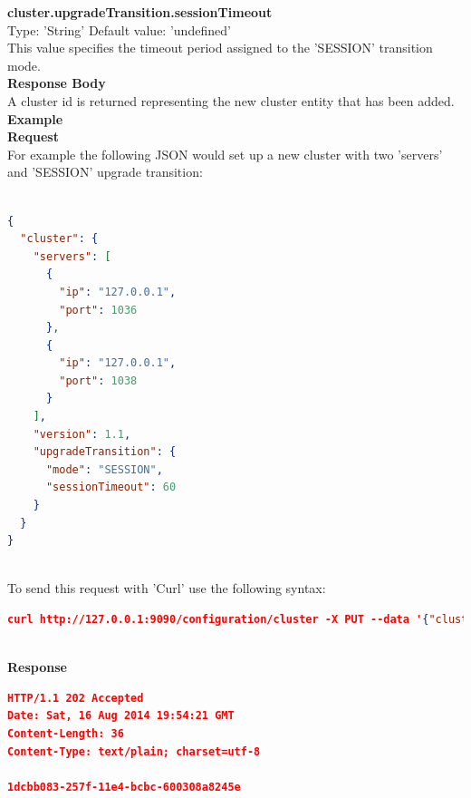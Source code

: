 \documentclass[a4paper,11pt,twoside]{article}
\begin{document}
\noindent
\textbf{cluster.upgradeTransition.sessionTimeout}\\
\noindent
Type: 'String' Default value: 'undefined'\\
\noindent
This value specifies the timeout period assigned to the 'SESSION' transition mode. \\

\noindent
\textbf{Response Body}\\
\noindent
A cluster id is returned representing the new cluster entity that has been added. \\

\noindent
\textbf{Example}\\

\noindent
\textbf{Request}\\
\noindent
For example the following JSON would set up a new cluster with two 'servers' and 'SESSION' upgrade transition:

\begin{lstlisting}[language=json,firstnumber=1]

{
  "cluster": {
    "servers": [
      {
        "ip": "127.0.0.1", 
        "port": 1036
      },  
      {
        "ip": "127.0.0.1", 
        "port": 1038
      }
    ], 
    "version": 1.1, 
    "upgradeTransition": {
      "mode": "SESSION", 
      "sessionTimeout": 60
    }
  }
}
\end{lstlisting}

\noindent \\
To send this request with 'Curl' use the following syntax:\\

\begin{lstlisting}[language=json,firstnumber=1]
curl http://127.0.0.1:9090/configuration/cluster -X PUT --data '{"cluster": {"servers":[{"ip": "127.0.0.1", "port": 1036},{"ip": "127.0.0.1", "port": 1038}],"version": 1.1,"upgradeTransition": { "mode": "SESSION", "sessionTimeout": 60 }}}'
\end{lstlisting}

\noindent \\
\textbf{Response}\\

\begin{lstlisting}[language=json,firstnumber=1]
HTTP/1.1 202 Accepted
Date: Sat, 16 Aug 2014 19:54:21 GMT
Content-Length: 36
Content-Type: text/plain; charset=utf-8
 
1dcbb083-257f-11e4-bcbc-600308a8245e
\end{lstlisting}
\end{document}

